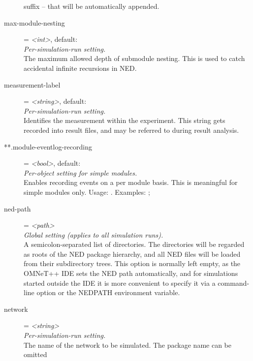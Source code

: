 \begin{description}
     suffix -- that will be automatically appended.
\item[max-module-nesting] = \textit{<int>}, default: \\
    \textit{Per-simulation-run setting.}\\
    The maximum allowed depth of submodule nesting. This is used to catch
    accidental infinite recursions in NED.
\item[measurement-label] = \textit{<string>}, default: \\
    \textit{Per-simulation-run setting.}\\
    Identifies the measurement within the experiment. This string gets recorded
    into result files, and may be referred to during result analysis.
\item[**.module-eventlog-recording] = \textit{<bool>}, default: \\
    \textit{Per-object setting for simple modules.}\\
    Enables recording events on a per module basis. This is meaningful for
    simple modules only. Usage:
    .
    Examples:
    ;
\item[ned-path] = \textit{<path>}\\
    \textit{Global setting (applies to all simulation runs).}\\
    A semicolon-separated list of directories. The directories will be regarded
    as roots of the NED package hierarchy, and all NED files will be loaded
    from their subdirectory trees. This option is normally left empty, as the
    OMNeT++ IDE sets the NED path automatically, and for simulations started
    outside the IDE it is more convenient to specify it via a command-line
    option or the NEDPATH environment variable.
\item[network] = \textit{<string>}\\
    \textit{Per-simulation-run setting.}\\
    The name of the network to be simulated.  The package name can be omitted

\end{description}
